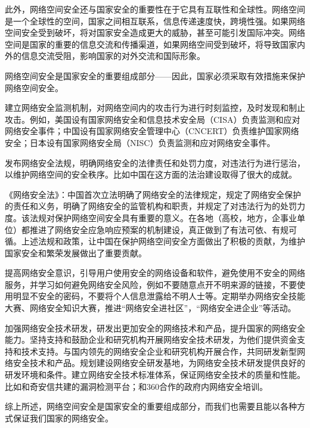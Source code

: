 \documentclass{ctexart}
\begin{document}
此外，网络空间安全还与国家安全的重要性在于它具有互联性和全球性。网络空间是一个全球性的空间，国家之间相互联系，信息传递速度快，跨境性强。如果网络空间安全受到破坏，将对国家安全造成更大的威胁，甚至可能引发国际冲突。网络空间是国家的重要的信息交流和传播渠道，如果网络空间受到破坏，将导致国家内外的信息交流受阻，影响国家的对外交流和国际形象。

网络空间安全是国家安全的重要组成部分——因此，国家必须采取有效措施来保护网络空间安全。

建立网络安全监测机制，对网络空间内的攻击行为进行时刻监控，及时发现和制止攻击。例如，美国设有国家网络安全和信息技术安全局（CISA）负责监测和应对网络安全事件；中国设有国家网络安全管理中心（CNCERT）负责维护国家网络安全；日本设有国家网络安全局（NISC）负责监测和应对网络安全事件。

发布网络安全法规，明确网络安全的法律责任和处罚力度，对违法行为进行惩治，以维护网络空间的安全秩序。比如中国在这方面的法治建设取得了很大的成就。

《网络安全法》：中国首次立法明确了网络安全的法律规定，规定了网络安全保护的责任和义务，明确了网络安全的监管机构和职责，并规定了对违法行为的处罚力度。该法规对保护网络空间安全具有重要的意义。在各地（高校，地方，企事业单位）都推进了网络安全应急响应预案的机制建设，真正做到了有法可依、有规可循。上述法规和政策，让中国在保护网络空间安全方面做出了积极的贡献，为维护国家安全和繁荣发展做出了重要贡献。

提高网络安全意识，引导用户使用安全的网络设备和软件，避免使用不安全的网络服务，并学习如何避免网络安全风险，例如不要随意点开不明来源的链接，不要使用明显不安全的密码，不要将个人信息泄露给不明人士等。定期举办网络安全技能大赛、网络安全知识大赛，推进“网络安全进社区”，“网络安全进企业”等活动。

加强网络安全技术研发，研发出更加安全的网络技术和产品，提升国家的网络安全能力。坚持支持和鼓励企业和研究机构开展网络安全技术研发，为他们提供资金支持和技术支持。与国内领先的网络安全企业和研究机构开展合作，共同研发新型网络安全技术和产品。规划建设网络安全研发基地，为网络安全技术研发提供良好的研发环境和条件。建立网络安全技术标准体系，保证网络安全技术的质量和性能。比如和奇安信共建的漏洞检测平台；和360合作的政府内网络安全培训。

综上所述，网络空间安全是国家安全的重要组成部分，而我们也需要且能以各种方式保证我们国家的网络安全。
\end{document}
